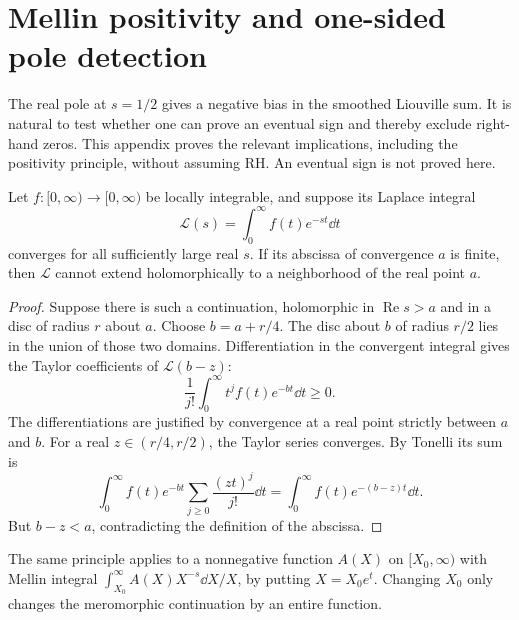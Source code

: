 \section{Mellin positivity and one-sided pole detection}
\label{app:mellin-positivity}

The real pole at \(s=1/2\) gives a negative bias in the smoothed
Liouville sum. It is natural to test whether one can prove an eventual
sign and thereby exclude right-hand zeros. This appendix proves
the relevant implications, including the positivity principle,
without assuming RH. An eventual sign is not proved here.

\begin{lemma}\label{lem:landau-positive}
Let \(f:[0,\infty)\to[0,\infty)\) be locally integrable, and suppose
its Laplace integral
\[
 \mathcal L(s)=\int_0^\infty f(t)e^{-st}\dd t
\]
converges for all sufficiently large real \(s\). If its abscissa
of convergence \(a\) is finite, then \(\mathcal L\) cannot extend
holomorphically to a neighborhood of the real point \(a\).
\end{lemma}
\begin{proof}
Suppose there is such a continuation, holomorphic in
\(\operatorname{Re}s>a\) and in a disc of radius \(r\) about \(a\).
Choose \(b=a+r/4\). The disc about \(b\) of radius \(r/2\)
lies in the union of those two domains. Differentiation in the
convergent integral gives the Taylor coefficients of
\(\mathcal L(b-z)\):
\[
 \frac1{j!}\int_0^\infty t^j f(t)e^{-bt}\dd t\ge0.
\]
The differentiations are justified by convergence at a real
point strictly between \(a\) and \(b\). For a real
\(z\in(r/4,r/2)\), the Taylor series converges. By Tonelli its
sum is
\[
 \int_0^\infty f(t)e^{-bt}
                 \sum_{j\ge0}\frac{(zt)^j}{j!}\dd t
 =\int_0^\infty f(t)e^{-(b-z)t}\dd t.
\]
But \(b-z<a\), contradicting the definition of the abscissa.
\end{proof}

The same principle applies to a nonnegative function \(A(X)\) on
\([X_0,\infty)\) with Mellin integral
\(\int_{X_0}^\infty A(X)X^{-s}\dd X/X\), by putting
\(X=X_0e^t\). Changing \(X_0\) only changes the meromorphic
continuation by an entire function.

